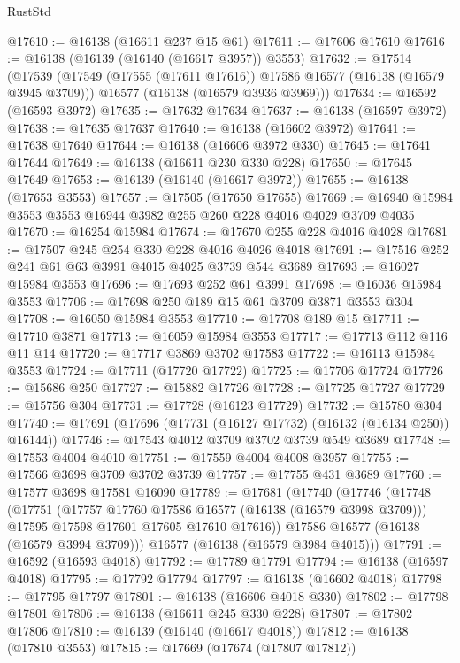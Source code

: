 \begin{lexlean}{RustStd}
\begin{coremodule}
@17610 := @16138 (@16611 @237 @15 @61)
@17611 := @17606 @17610
@17616 := @16138 (@16139 (@16140 (@16617 @3957)) @3553)
@17632 := @17514
    (@17539
      (@17549 (@17555 (@17611 @17616)) @17586 @16577 (@16138 (@16579 @3945 @3709)))
      @16577
      (@16138 (@16579 @3936 @3969)))
@17634 := @16592 (@16593 @3972)
@17635 := @17632 @17634
@17637 := @16138 (@16597 @3972)
@17638 := @17635 @17637
@17640 := @16138 (@16602 @3972)
@17641 := @17638 @17640
@17644 := @16138 (@16606 @3972 @330)
@17645 := @17641 @17644
@17649 := @16138 (@16611 @230 @330 @228)
@17650 := @17645 @17649
@17653 := @16139 (@16140 (@16617 @3972))
@17655 := @16138 (@17653 @3553)
@17657 := @17505 (@17650 @17655)
@17669 := @16940 @15984 @3553 @3553 @16944 @3982 @255 @260 @228 @4016 @4029 @3709 @4035
@17670 := @16254 @15984
@17674 := @17670 @255 @228 @4016 @4028
@17681 := @17507 @245 @254 @330 @228 @4016 @4026 @4018
@17691 := @17516 @252 @241 @61 @63 @3991 @4015 @4025 @3739 @544 @3689
@17693 := @16027 @15984 @3553
@17696 := @17693 @252 @61 @3991
@17698 := @16036 @15984 @3553
@17706 := @17698 @250 @189 @15 @61 @3709 @3871 @3553 @304
@17708 := @16050 @15984 @3553
@17710 := @17708 @189 @15
@17711 := @17710 @3871
@17713 := @16059 @15984 @3553
@17717 := @17713 @112 @116 @11 @14
@17720 := @17717 @3869 @3702 @17583
@17722 := @16113 @15984 @3553
@17724 := @17711 (@17720 @17722)
@17725 := @17706 @17724
@17726 := @15686 @250
@17727 := @15882 @17726
@17728 := @17725 @17727
@17729 := @15756 @304
@17731 := @17728 (@16123 @17729)
@17732 := @15780 @304
@17740 := @17691 (@17696 (@17731 (@16127 @17732) (@16132 (@16134 @250)) @16144))
@17746 := @17543 @4012 @3709 @3702 @3739 @549 @3689
@17748 := @17553 @4004 @4010
@17751 := @17559 @4004 @4008 @3957
@17755 := @17566 @3698 @3709 @3702 @3739
@17757 := @17755 @431 @3689
@17760 := @17577 @3698 @17581 @16090
@17789 := @17681
    (@17740
      (@17746
        (@17748
          (@17751
            (@17757 @17760 @17586 @16577 (@16138 (@16579 @3998 @3709)))
            @17595
            @17598
            @17601
            @17605
            @17610
            @17616))
        @17586
        @16577
        (@16138 (@16579 @3994 @3709)))
      @16577
      (@16138 (@16579 @3984 @4015)))
@17791 := @16592 (@16593 @4018)
@17792 := @17789 @17791
@17794 := @16138 (@16597 @4018)
@17795 := @17792 @17794
@17797 := @16138 (@16602 @4018)
@17798 := @17795 @17797
@17801 := @16138 (@16606 @4018 @330)
@17802 := @17798 @17801
@17806 := @16138 (@16611 @245 @330 @228)
@17807 := @17802 @17806
@17810 := @16139 (@16140 (@16617 @4018))
@17812 := @16138 (@17810 @3553)
@17815 := @17669 (@17674 (@17807 @17812))

\end{coremodule}
\end{lexlean}
